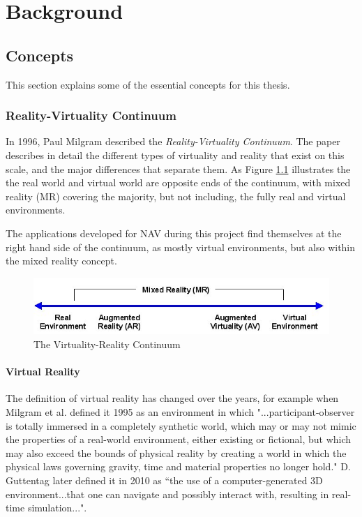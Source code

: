 
\chapter{Background}
\label{chap:background}



\section{Concepts}
This section explains some of the essential concepts for this thesis.


\subsection{Reality-Virtuality Continuum} \label{background:Continuum}
In 1996, Paul Milgram described the \textit{Reality-Virtuality Continuum}\cite{milgram1995augmented}. The paper describes in detail the different types of virtuality and reality that exist on this scale, and the major differences that separate them. As Figure \ref{fig:VR_continuum} illustrates the the real world and virtual world are opposite ends of the continuum, with mixed reality (MR) covering the majority, but not including, the fully real and virtual environments. 

The applications developed for NAV during this project find themselves at the right hand side of the continuum, as mostly virtual environments, but also within the mixed reality concept.  

\begin{figure}
    \centering
    \includegraphics[width=\textwidth]{./fig/background/Virtuality_Continuum_2}
    \caption{The Virtuality-Reality Continuum}
    \label{fig:VR_continuum}
\end{figure}


\subsubsection{Virtual Reality}
The definition of virtual reality has changed over the years, for example when Milgram et al. defined it 1995 \cite{milgram1995augmented} as an environment in which "...participant-observer is totally immersed in a completely synthetic world, which may or may not mimic the properties of a real-world environment, either existing or fictional, but which may also exceed the bounds of physical reality by creating a world in which the physical laws governing gravity, time and material properties no longer hold." D. Guttentag \cite{guttentag2010virtual} later defined it in 2010 as “the use of a computer-generated 3D environment...that one can navigate and possibly interact with, resulting in real-time simulation...".

